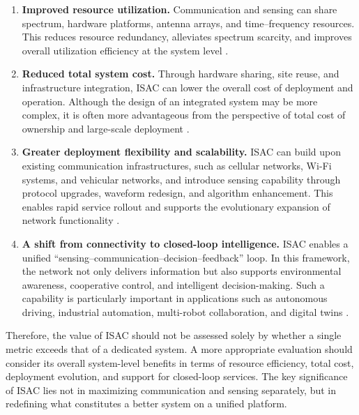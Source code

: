 \begin{enumerate}[label=(\arabic*)]
\item \textbf{Improved resource utilization.}  
Communication and sensing can share spectrum, hardware platforms, antenna arrays, and time--frequency resources. This reduces resource redundancy, alleviates spectrum scarcity, and improves overall utilization efficiency at the system level \cite{Liu2020JointRadarComm,Liu2022ISAC,Hassanien2015dual}.

\item \textbf{Reduced total system cost.}  
Through hardware sharing, site reuse, and infrastructure integration, ISAC can lower the overall cost of deployment and operation. Although the design of an integrated system may be more complex, it is often more advantageous from the perspective of total cost of ownership and large-scale deployment \cite{Liu2022ISAC,Wen2024survey}.

\item \textbf{Greater deployment flexibility and scalability.}  
ISAC can build upon existing communication infrastructures, such as cellular networks, Wi-Fi systems, and vehicular networks, and introduce sensing capability through protocol upgrades, waveform redesign, and algorithm enhancement. This enables rapid service rollout and supports the evolutionary expansion of network functionality \cite{Ma2022WiFiSensingSurvey}.

\item \textbf{A shift from connectivity to closed-loop intelligence.}  
ISAC enables a unified ``sensing--communication--decision--feedback'' loop. In this framework, the network not only delivers information but also supports environmental awareness, cooperative control, and intelligent decision-making. Such a capability is particularly important in applications such as autonomous driving, industrial automation, multi-robot collaboration, and digital twins \cite{Gonzalez2024integrated,Saad2020Vision6G}.
\end{enumerate}

Therefore, the value of ISAC should not be assessed solely by whether a single metric exceeds that of a dedicated system. A more appropriate evaluation should consider its overall system-level benefits in terms of resource efficiency, total cost, deployment evolution, and support for closed-loop services. The key significance of ISAC lies not in maximizing communication and sensing separately, but in redefining what constitutes a better system on a unified platform.

